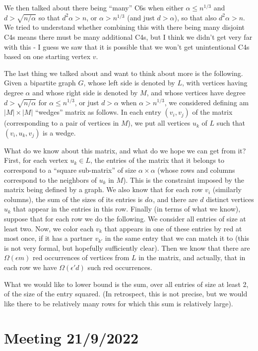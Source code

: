 \documentclass{article}
\newcommand{\eps}{\epsilon}
\begin{document}
We then talked about there being ``many'' C6s when either $\alpha \leq n^{1/3}$ and $d > \sqrt{n/\alpha}$ so that $d^2 \alpha > n$, or $\alpha > n^{1/3}$ (and just $d> \alpha$), so that also $d^2\alpha > n$. We tried to understand whether combining this with there being many disjoint C4s means there must be many additional C4s, but I think we didn't get very far with this - I guess we saw that it is possible that we won't get unintentional C4s based on one starting vertex $v$.

\bigskip
The last thing we talked about and want to think about more is the following.
Given a bipartite graph $G$, whose left side is denoted by $L$, with vertices having degree $\alpha$ and whose right side is denoted by $M$, and whose vertices have degree $d > \sqrt{n/\alpha}$ for $\alpha \leq n^{1/3}$, or just $d> \alpha$ when $\alpha > n^{1/3}$, we considered defining am $|M| \times |M|$  ``wedges'' matrix as follows. In each entry $(v_i,v_j)$ of the matrix (corresponding to a pair of vertices in $M$), we put all vertices $u_k$ of $L$ such that $(v_i,u_k,v_j)$ is a wedge.

What do we know about this matrix, and what do we hope we can get from it?
First, for each vertex $u_k \in L$, the entries of the matrix that it belongs to correspond to a ``square sub-matrix'' of size $\alpha \times \alpha$ (whose rows and columns correspond to the neighbors of $u_k$ in $M$). This is the constraint imposed by the matrix being defined by a graph. We also know  that for each row $v_i$ (similarly columns), the sum of the sizes of its entries is $d\alpha$, and there are $d$ distinct vertices $u_k$ that appear in the entries in this row. Finally (in terms of what we know), suppose that for each row we do the following. We consider all entries of size at least two. Now, we color each $v_k$ that appears in one of these entries by red at most once, if it has a partner $v_{k'}$ in the same entry that we can match it to (this is not very formal, but hopefully sufficiently clear). Then we know that there are $\Omega(\eps m)$  red occurrences of vertices from $L$ in the matrix, and actually, that in each row we have $\Omega(\eps' d)$ such red occurrences.

What we would like to lower bound is the sum, over all entries of size at least 2, of the size of the entry squared.
(In retrospect, this is not precise, but we would like there to be relatively many rows for which this sum is relatively large).

\section{Meeting 21/9/2022}
\end{document}
